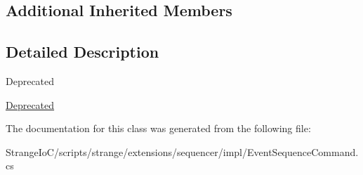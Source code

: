 \subsection*{Additional Inherited Members}


\subsection{Detailed Description}
\begin{DoxyRefDesc}{Deprecated}
\item[\hyperlink{deprecated__deprecated000004}{Deprecated}]\end{DoxyRefDesc}


The documentation for this class was generated from the following file\-:\begin{DoxyCompactItemize}
\item 
Strange\-Io\-C/scripts/strange/extensions/sequencer/impl/Event\-Sequence\-Command.\-cs\end{DoxyCompactItemize}
